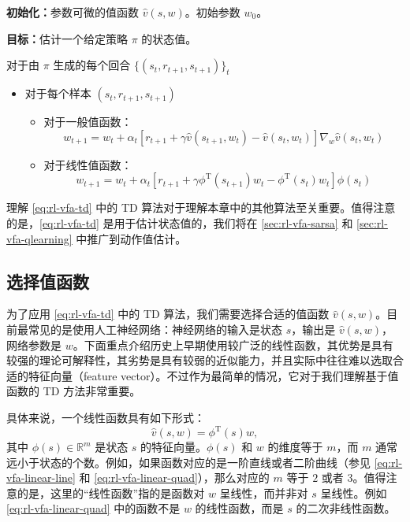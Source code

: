 \begin{algo}
\label{alg:rl-vfa-td-state}
\textbf{初始化：}参数可微的值函数 $\hat{v}(s,w)$。初始参数 $w_{0}$。

\textbf{目标：}估计一个给定策略 $\pi$ 的状态值。

\smallskip
对于由 $\pi$ 生成的每个回合 $\{(s_t,r_{t+1},s_{t+1})\}_{t}$
\begin{itemize}
  \item 对于每个样本 $(s_t,r_{t+1},s_{t+1})$
  \begin{itemize}
    \item 对于一般值函数：
    \begin{equation*}
    w_{t+1} = w_t + \alpha_t[r_{t+1} + \gamma \hat{v}(s_{t+1},w_t) - \hat{v}(s_t,w_t)]\nabla_w\hat{v}(s_t,w_t)
    \end{equation*}
    \item 对于线性值函数：
    \begin{equation*}
    w_{t+1} = w_t + \alpha_t[r_{t+1} + \gamma \phi^{\mathrm{T}}(s_{t+1})w_t - \phi^{\mathrm{T}}(s_t)w_t]\phi(s_t)
    \end{equation*}
  \end{itemize}
\end{itemize}
\end{algo}

理解 \cref{eq:rl-vfa-td} 中的 TD 算法对于理解本章中的其他算法至关重要。值得注意的是，\cref{eq:rl-vfa-td} 是用于估计状态值的，我们将在 \cref{sec:rl-vfa-sarsa} 和 \cref{sec:rl-vfa-qlearning} 中推广到动作值估计。

\subsection{选择值函数}
\label{sec:rl-vfa-featsel}

为了应用 \cref{eq:rl-vfa-td} 中的 TD 算法，我们需要选择合适的值函数 $\hat{v}(s,w)$。目前最常见的是使用人工神经网络：神经网络的输入是状态 $s$，输出是 $\hat{v}(s,w)$，网络参数是 $w$。下面重点介绍历史上早期使用较广泛的线性函数，其优势是具有较强的理论可解释性，其劣势是具有较弱的近似能力，并且实际中往往难以选取合适的特征向量（feature vector）。不过作为最简单的情况，它对于我们理解基于值函数的 TD 方法非常重要。

具体来说，一个线性函数具有如下形式：
\begin{equation*}
\hat{v}(s, w) = \phi^{\mathrm{T}}(s) w,
\end{equation*}
其中 $\phi(s) \in \mathbb{R}^m$ 是状态 $s$ 的特征向量。$\phi(s)$ 和 $w$ 的维度等于 $m$，而 $m$ 通常远小于状态的个数。例如，如果函数对应的是一阶直线或者二阶曲线（参见 \cref{eq:rl-vfa-linear-line} 和 \cref{eq:rl-vfa-linear-quad}），那么对应的 $m$ 等于 $2$ 或者 $3$。值得注意的是，这里的“线性函数”指的是函数对 $w$ 呈线性，而并非对 $s$ 呈线性。例如 \cref{eq:rl-vfa-linear-quad} 中的函数不是 $w$ 的线性函数，而是 $s$ 的二次非线性函数。

